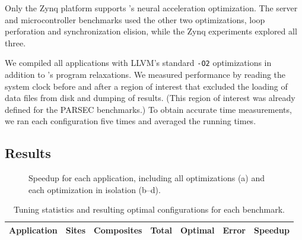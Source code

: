 Only the Zynq platform supports \sysname's neural acceleration optimization.
The server and microcontroller benchmarks used the other two optimizations,
loop perforation and synchronization elision, while the Zynq experiments
explored all three.

We compiled all applications with LLVM's standard \texttt{-O2} optimizations
in addition to \sysname's program relaxations.
%
We measured performance by reading the system clock before and after a
region of interest that excluded the
loading of data files from disk and dumping of results. (This region of
interest was already defined for the PARSEC benchmarks.)
To obtain accurate time measurements, we ran each configuration five times and
averaged the running times.


\subsection{Results}
\label{accept:sec:results}

\begin{figure}
\centering
{}
\caption{Speedup for each application, including all
optimizations (a) and each optimization in isolation (b--d).}
\label{accept:fig:performance}
\end{figure}

\begin{table}
\centering
\footnotesize
\begin{tabular}{l r r r r r r}
\toprule
Application & Sites & Composites & Total & Optimal & Error & Speedup \\
\midrule

\bottomrule
\end{tabular}
\caption{Tuning statistics and resulting optimal configurations for each benchmark.}
\label{accept:table:stats}
\end{table}

